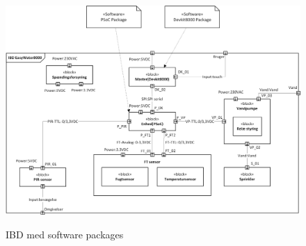 \begin{figure}[!htbp] \centering
{\includegraphics[scale=0.7]{filer/systemarkitektur/IBD_deployment}}
\caption{IBD med software packages}
\label{fig:IBD deployment}
\end{figure}

